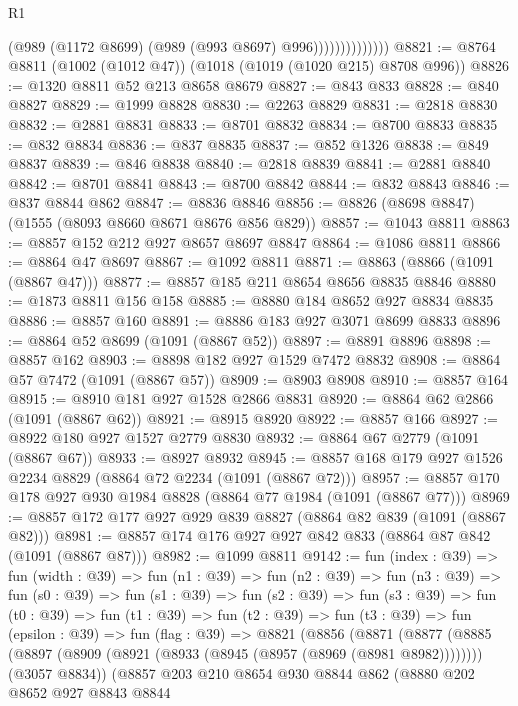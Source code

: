 \begin{lexlean}{R1}
\begin{coremodule}
                            (@989 (@1172 @8699) (@989 (@993 @8697) @996))))))))))))))
@8821 := @8764 @8811 (@1002 (@1012 @47)) (@1018 (@1019 (@1020 @215) @8708 @996))
@8826 := @1320 @8811 @52 @213 @8658 @8679
@8827 := @843 @833
@8828 := @840 @8827
@8829 := @1999 @8828
@8830 := @2263 @8829
@8831 := @2818 @8830
@8832 := @2881 @8831
@8833 := @8701 @8832
@8834 := @8700 @8833
@8835 := @832 @8834
@8836 := @837 @8835
@8837 := @852 @1326
@8838 := @849 @8837
@8839 := @846 @8838
@8840 := @2818 @8839
@8841 := @2881 @8840
@8842 := @8701 @8841
@8843 := @8700 @8842
@8844 := @832 @8843
@8846 := @837 @8844 @862
@8847 := @8836 @8846
@8856 := @8826 (@8698 @8847) (@1555 (@8093 @8660 @8671 @8676 @856 @829))
@8857 := @1043 @8811
@8863 := @8857 @152 @212 @927 @8657 @8697 @8847
@8864 := @1086 @8811
@8866 := @8864 @47 @8697
@8867 := @1092 @8811
@8871 := @8863 (@8866 (@1091 (@8867 @47)))
@8877 := @8857 @185 @211 @8654 @8656 @8835 @8846
@8880 := @1873 @8811 @156 @158
@8885 := @8880 @184 @8652 @927 @8834 @8835
@8886 := @8857 @160
@8891 := @8886 @183 @927 @3071 @8699 @8833
@8896 := @8864 @52 @8699 (@1091 (@8867 @52))
@8897 := @8891 @8896
@8898 := @8857 @162
@8903 := @8898 @182 @927 @1529 @7472 @8832
@8908 := @8864 @57 @7472 (@1091 (@8867 @57))
@8909 := @8903 @8908
@8910 := @8857 @164
@8915 := @8910 @181 @927 @1528 @2866 @8831
@8920 := @8864 @62 @2866 (@1091 (@8867 @62))
@8921 := @8915 @8920
@8922 := @8857 @166
@8927 := @8922 @180 @927 @1527 @2779 @8830
@8932 := @8864 @67 @2779 (@1091 (@8867 @67))
@8933 := @8927 @8932
@8945 := @8857 @168 @179 @927 @1526 @2234 @8829 (@8864 @72 @2234 (@1091 (@8867 @72)))
@8957 := @8857 @170 @178 @927 @930 @1984 @8828 (@8864 @77 @1984 (@1091 (@8867 @77)))
@8969 := @8857 @172 @177 @927 @929 @839 @8827 (@8864 @82 @839 (@1091 (@8867 @82)))
@8981 := @8857 @174 @176 @927 @927 @842 @833 (@8864 @87 @842 (@1091 (@8867 @87)))
@8982 := @1099 @8811
@9142 := fun (index : @39) =>
  fun (width : @39) =>
  fun (n1 : @39) =>
  fun (n2 : @39) =>
  fun (n3 : @39) =>
  fun (s0 : @39) =>
  fun (s1 : @39) =>
  fun (s2 : @39) =>
  fun (s3 : @39) =>
  fun (t0 : @39) =>
  fun (t1 : @39) =>
  fun (t2 : @39) =>
  fun (t3 : @39) =>
  fun (epsilon : @39) =>
  fun (flag : @39) =>
  @8821
    (@8856
      (@8871
        (@8877
          (@8885
            (@8897 (@8909 (@8921 (@8933 (@8945 (@8957 (@8969 (@8981 @8982))))))))
            (@3057 @8834))
          (@8857
            @203
            @210
            @8654
            @930
            @8844
            @862
            (@8880
              @202
              @8652
              @927
              @8843
              @8844

\end{coremodule}
\end{lexlean}
